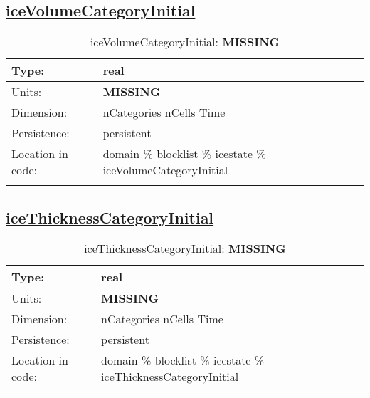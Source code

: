 \subsection[iceVolumeCategoryInitial]{\hyperref[sec:var_tab_icestate]{iceVolumeCategoryInitial}}
\label{subsec:var_sec_icestate_iceVolumeCategoryInitial}
\begin{center}
\begin{longtable}{| p{2.0in} | p{4.0in} |}
        \hline 
        Type: & real \\
        \hline 
        Units: & {\bf \color{red} MISSING} \\
        \hline 
        Dimension: & nCategories nCells Time \\
        \hline 
        Persistence: & persistent \\
        \hline 
         Location in code: & domain \% blocklist \% icestate \% iceVolumeCategoryInitial \\
         \hline 
    \caption{iceVolumeCategoryInitial: {\bf \color{red} MISSING}}
\end{longtable}
\end{center}
\subsection[iceThicknessCategoryInitial]{\hyperref[sec:var_tab_icestate]{iceThicknessCategoryInitial}}
\label{subsec:var_sec_icestate_iceThicknessCategoryInitial}
\begin{center}
\begin{longtable}{| p{2.0in} | p{4.0in} |}
        \hline 
        Type: & real \\
        \hline 
        Units: & {\bf \color{red} MISSING} \\
        \hline 
        Dimension: & nCategories nCells Time \\
        \hline 
        Persistence: & persistent \\
        \hline 
         Location in code: & domain \% blocklist \% icestate \% iceThicknessCategoryInitial \\
         \hline 
    \caption{iceThicknessCategoryInitial: {\bf \color{red} MISSING}}
\end{longtable}
\end{center}
